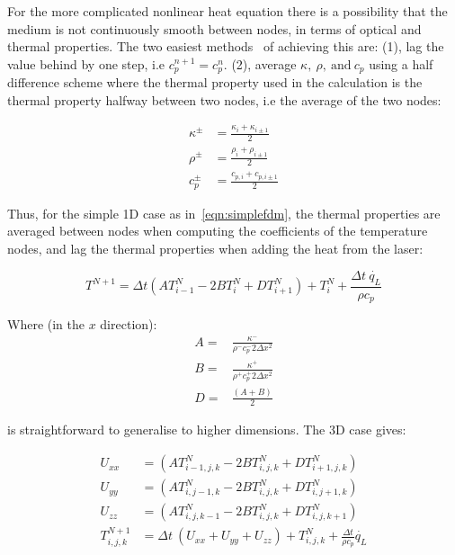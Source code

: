 \medskip

For the more complicated nonlinear heat equation there is a possibility that the medium is not continuously smooth between nodes, in terms of optical and thermal properties. The two easiest methods~\cite{ozisik1994finite} of achieving this are: (1), lag the value behind by one step, i.e $c_{p}^{n+1}=c_{p}^{n}$. (2), average $\kappa,\ \rho,\ \text{and}\ c_p$ using a half difference scheme where the thermal property used in the calculation is the thermal property halfway between two nodes, i.e the average of the two nodes:

\begin{align}
\kappa^{\pm}&=\frac{\kappa_i+\kappa_{i\pm 1}}{2}\\
\rho^{\pm}&=\frac{\rho_i+\rho_{i\pm 1}}{2}\\
c_p^{\pm}&=\frac{c_{p,i}+c_{p,i\pm 1}}{2}
\end{align}

Thus, for the simple 1D case as in~\cref{eqn:simplefdm}, the thermal properties are averaged between nodes when computing the coefficients of the temperature nodes, and lag the thermal properties when adding the heat from the laser:

\begin{equation}
T^{N+1}=\Delta t (AT^N_{i-1}-2BT^N_{i}+DT^N_{i+1})+ T_i^N + \frac{\Delta t\ \dot{q_L}}{\rho c_p}\label{eqn:heatnonlin1d}
\end{equation}

Where (in the $x$ direction):
\begin{align}
A=&\frac{\kappa^{-}}{\rho^{-}c_{p}^{-}2\Delta x^2} \nonumber \\
B=&\frac{\kappa^{+}}{\rho^{+}c_{p}^{+}2\Delta x^2} \label{eqn:coeffsABD}\\
D=&\frac{(A+B)}{2} \nonumber
\end{align}

 is straightforward to generalise to higher dimensions. The 3D case gives:

\begin{align}
U_{xx} &=  (A T^N_{i-1,j,k} - 2B T^N_{i,j,k} + D T^N_{i+1,j,k}) \label{eqn:FDMheat1}\\
U_{yy} &=  (A T^N_{i,j-1,k} - 2B T^N_{i,j,k} + D T^N_{i,j+1,k}) \label{eqn:FDMheat2}\\
U_{zz} &=  (A T^N_{i,j,k-1} - 2B T^N_{i,j,k} + D T^N_{i,j,k+1}) \label{eqn:FDMheat3}\\
T^{N+1}_{i,j,k} &= \Delta t\ (U_{xx} + U_{yy} + U_{zz}) + T^{N}_{i,j,k} + \tfrac{\Delta t}{\rho c_p}\dot{q_L} \label{eqn:FDMheat4}
\end{align}

